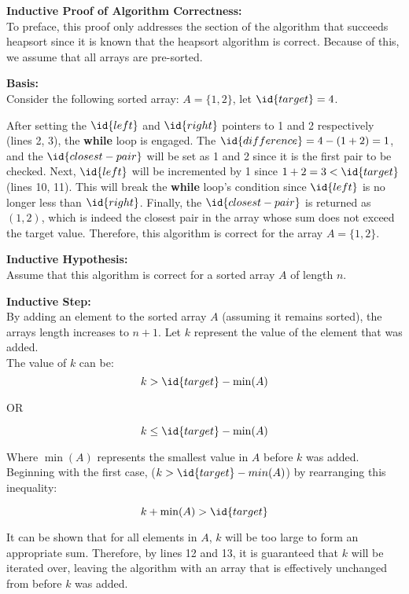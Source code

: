     \textbf{Inductive Proof of Algorithm Correctness:} \\
    To preface, this proof only addresses the section of the algorithm that succeeds heapsort since it is known that the heapsort algorithm is correct.
    Because of this, we assume that all arrays are pre-sorted.

    \textbf{Basis:} \\
    Consider the following sorted array: $A = \{1, 2\}$,
    let $\id{target} = 4$.

    After setting the $\id{left}$ and $\id{right}$ pointers to 1 and 2 respectively (lines 2, 3), the \textbf{while} loop is engaged.
    The $\id{difference} = 4 - (1 + 2) = 1$, and the $\id{closest-pair}$ will be set as 1 and 2 since it is the first pair to be checked.
    Next, $\id{left}$ will be incremented by 1 since $1 + 2 = 3 < \id{target}$ (lines 10, 11).
    This will break the \textbf{while} loop's condition since $\id{left}$ is no longer less than $\id{right}$.
    Finally, the $\id{closest-pair}$ is returned as $(1, 2)$, which is indeed the closest pair in the array whose sum does not exceed the target value.
    Therefore, this algorithm is correct for the array $A = \{1, 2\}$.

    \textbf{Inductive Hypothesis:}\\
    Assume that this algorithm is correct for a sorted array $A$ of length $n$.

    \textbf{Inductive Step:}\\
    By adding an element to the sorted array $A$ (assuming it remains sorted), the arrays length increases to $n + 1$.
    Let $k$ represent the value of the element that was added.
    \vspace{1cm} \\
    The value of $k$ can be:
    \[k > \id{target} - \min(A)\]
    \begin{center}
        OR
    \end{center}
    \[k \le \id{target} - \min(A)\]

    Where $\min(A)$ represents the smallest value in $A$ before $k$ was added. 
    Beginning with the first case, ($k > \id{target} - min(A)$) by rearranging this inequality:

    \[k + \min(A) > \id{target}\]

    It can be shown that for all elements in $A$, $k$ will be too large to form an appropriate sum.
    Therefore, by lines 12 and 13, it is guaranteed that $k$ will be iterated over, leaving the algorithm with an array that is effectively unchanged from before $k$ was added.

